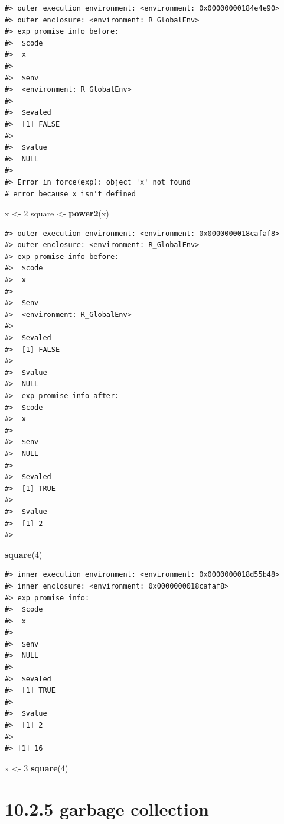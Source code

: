 \documentclass[]{book}
\newenvironment{Shaded}{\begin{snugshade}}{\end{snugshade}}
\newcommand{\DecValTok}[1]{\textcolor[rgb]{0.00,0.00,0.81}{#1}}
\newcommand{\KeywordTok}[1]{\textcolor[rgb]{0.13,0.29,0.53}{\textbf{#1}}}
\newcommand{\NormalTok}[1]{#1}
\newcommand{\StringTok}[1]{\textcolor[rgb]{0.31,0.60,0.02}{#1}}
\begin{document}
\begin{verbatim}
#> outer execution environment: <environment: 0x00000000184e4e90>
#> outer enclosure: <environment: R_GlobalEnv>
#> exp promise info before: 
#>  $code
#>  x
#>  
#>  $env
#>  <environment: R_GlobalEnv>
#>  
#>  $evaled
#>  [1] FALSE
#>  
#>  $value
#>  NULL
#>  
#> Error in force(exp): object 'x' not found
# error because x isn't defined
\end{verbatim}

\begin{Shaded}
\begin{Highlighting}[]
\NormalTok{x <-}\StringTok{ }\DecValTok{2}
\NormalTok{square <-}\StringTok{ }\KeywordTok{power2}\NormalTok{(x)}
\end{Highlighting}
\end{Shaded}

\begin{verbatim}
#> outer execution environment: <environment: 0x0000000018cafaf8>
#> outer enclosure: <environment: R_GlobalEnv>
#> exp promise info before: 
#>  $code
#>  x
#>  
#>  $env
#>  <environment: R_GlobalEnv>
#>  
#>  $evaled
#>  [1] FALSE
#>  
#>  $value
#>  NULL
#>  exp promise info after: 
#>  $code
#>  x
#>  
#>  $env
#>  NULL
#>  
#>  $evaled
#>  [1] TRUE
#>  
#>  $value
#>  [1] 2
#>  
\end{verbatim}

\begin{Shaded}
\begin{Highlighting}[]
\KeywordTok{square}\NormalTok{(}\DecValTok{4}\NormalTok{)}
\end{Highlighting}
\end{Shaded}

\begin{verbatim}
#> inner execution environment: <environment: 0x0000000018d55b48>
#> inner enclosure: <environment: 0x0000000018cafaf8>
#> exp promise info: 
#>  $code
#>  x
#>  
#>  $env
#>  NULL
#>  
#>  $evaled
#>  [1] TRUE
#>  
#>  $value
#>  [1] 2
#>  
#> [1] 16
\end{verbatim}

\begin{Shaded}
\begin{Highlighting}[]
\NormalTok{x <-}\StringTok{ }\DecValTok{3}
\KeywordTok{square}\NormalTok{(}\DecValTok{4}\NormalTok{)}
\end{Highlighting}
\end{Shaded}

\hypertarget{garbage-collection}{%
\section*{10.2.5 garbage collection}\label{garbage-collection}}
\end{document}
